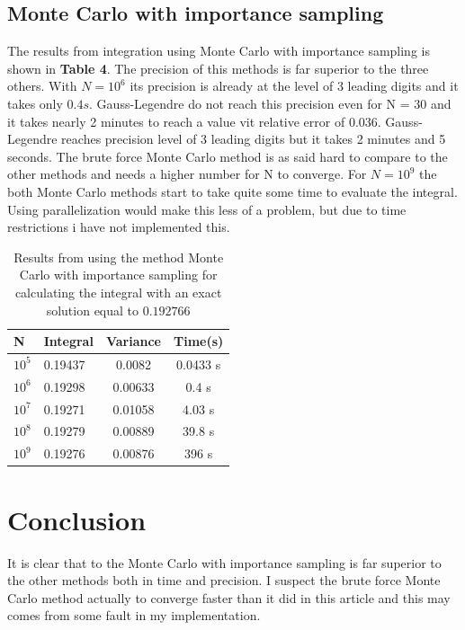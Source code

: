 \documentclass[twoside,twocolumn]{article}
\begin{document}
\subsection{Monte Carlo with importance sampling}

The results from integration using Monte Carlo with importance sampling is shown in \textbf{Table 4}. The precision of this methods is far superior to the three others. With $N = 10^6$ its precision is already at the level of 3 leading digits and it takes only $0.4 s$. Gauss-Legendre do not reach this precision even for N = 30 and it takes nearly 2 minutes to reach a value vit relative error of 0.036. Gauss-Legendre reaches precision level of 3 leading digits but it takes 2 minutes and 5 seconds. The brute force Monte Carlo method is as said hard to compare to the other methods and needs a higher number for N to converge. For $N = 10^9$ the both Monte Carlo methods start to take quite some time to evaluate the integral. Using parallelization would make this less of a problem, but due to time restrictions i have not implemented this.
\begin{table}[h]
\centering
\begin{tabular}{|l|l|c|c|}
\hline
N                     & Integral & \multicolumn{1}{l|}{Variance} & Time(s)  \\ \hline
$10^5$ & 0.19437  & 0.0082                        & 0.0433 s \\ \hline
$10^6$ & 0.19298  & 0.00633                       & 0.4 s    \\ \hline
$10^7$ & 0.19271  & 0.01058                       & 4.03 s   \\ \hline
$10^8$ & 0.19279  & 0.00889                       & 39.8 s   \\ \hline
$10^9$ & 0.19276  & 0.00876                       & 396 s    \\ \hline
\end{tabular}
\caption{Results from using the method Monte Carlo with importance sampling for calculating the integral with an exact solution equal to $0.192766$}
\end{table}

\section{Conclusion}
It is clear that to the Monte Carlo with importance sampling is far superior to the other methods both in time and precision. I suspect the brute force Monte Carlo method actually to converge faster than it did in this article and this may comes from some fault in my implementation. 
\end{document}
